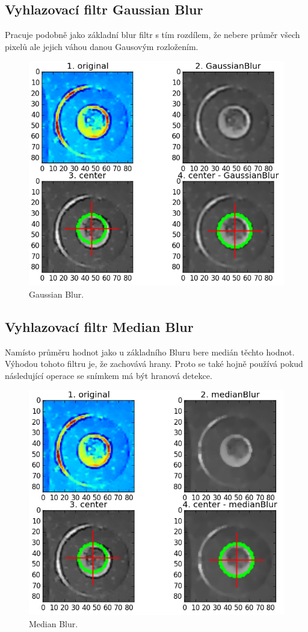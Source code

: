 \subsection{Vyhlazovací filtr Gaussian Blur}
Pracuje podobně jako základní blur filtr s tím rozdílem, že nebere průměr všech pixelů ale jejich váhou danou Gausovým rozložením. 
\begin{figure}[h!]
  \centering
    \includegraphics[width=0.8\linewidth]{obrazky/gaussianBlur.png}%
    \caption{Gaussian Blur.}
    \label{fig:gaussianBlur}
\end{figure}

\subsection{Vyhlazovací filtr Median Blur}

Namísto průměru hodnot jako u základního Bluru bere medián těchto hodnot. Výhodou tohoto filtru je, že zachovává hrany. Proto se také hojně používá pokud následující operace se snímkem má být hranová detekce. 

\begin{figure}[h!]
  \centering
    \includegraphics[width=0.8\linewidth]{obrazky/medianBlur.png}%
    \caption{Median Blur.}
    \label{fig:medianBlur}
\end{figure}

